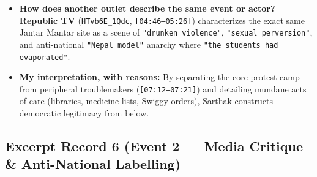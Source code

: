 \documentclass[10pt,a4paper]{article}
\begin{document}
\begin{itemize}[leftmargin=1.5em, itemsep=3pt, topsep=4pt]
  \item \textbf{How does another outlet describe the same event or actor?} \textbf{Republic TV} (\texttt{HTvb6E\_1Qdc}, \texttt{[04:46--05:26]}) characterizes the exact same Jantar Mantar site as a scene of \texttt{"drunken violence"}, \texttt{"sexual perversion"}, and anti-national \texttt{"Nepal model"} anarchy where \texttt{"the students had evaporated"}.
  \item \textbf{My interpretation, with reasons:} By separating the core protest camp from peripheral troublemakers (\texttt{[07:12--07:21]}) and detailing mundane acts of care (libraries, medicine lists, Swiggy orders), Sarthak constructs democratic legitimacy from below.
\end{itemize}

\subsection*{Excerpt Record 6 (Event 2 --- Media Critique \& Anti-National Labelling)}
\end{document}
